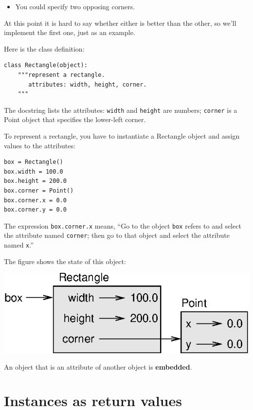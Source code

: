 \documentclass[10pt]{book}
\begin{document}
{\begin{itemize}
\item You could specify two opposing corners.

\end{itemize}

At this point it is hard to say whether either is better than
the other, so we'll implement the first one, just as an example.


Here is the class definition:

\beforeverb
\begin{verbatim}
class Rectangle(object):
    """represent a rectangle. 
       attributes: width, height, corner.
    """
\end{verbatim}
\afterverb
%
The docstring lists the attributes:  {\tt width} and
{\tt height} are numbers; {\tt corner} is a Point object that
specifies the lower-left corner.

To represent a rectangle, you have to instantiate a Rectangle
object and assign values to the attributes:

\beforeverb
\begin{verbatim}
box = Rectangle()
box.width = 100.0
box.height = 200.0
box.corner = Point()
box.corner.x = 0.0
box.corner.y = 0.0
\end{verbatim}
\afterverb
%
The expression {\tt box.corner.x} means,
``Go to the object {\tt box} refers to and select the attribute named
{\tt corner}; then go to that object and select the attribute named
{\tt x}.''

The figure shows the state of this object:


\beforefig
\centerline{\includegraphics{figs/rectangle.eps}}
\afterfig

An object that is an attribute of another object is {\bf embedded}.



\section{Instances as return values}

}
\end{document}
